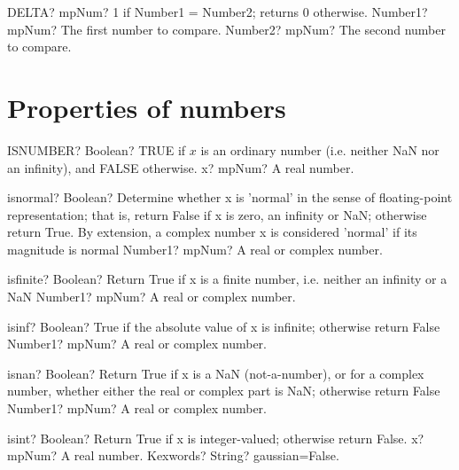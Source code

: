 \documentclass[12pt,a4paper,openany]{book}
\begin{document}
\begin{mpFunctionsExtract}
\mpWorksheetFunctionTwoNotImplemented
{DELTA? mpNum?  1 if Number1 = Number2; returns 0 otherwise.}
{Number1? mpNum? The first number to compare.}
{Number2? mpNum? The second number to compare.}
\end{mpFunctionsExtract}

\section{Properties of numbers}

\begin{mpFunctionsExtract}
\mpWorksheetFunctionOneNotImplemented
{ISNUMBER? Boolean? TRUE if $x$ is an ordinary number (i.e. neither NaN nor an infinity), and FALSE otherwise.}
{x? mpNum? A real number.}
\end{mpFunctionsExtract}

\begin{mpFunctionsExtract}
\mpFunctionOne
{isnormal? Boolean?  Determine whether x is 'normal' in the sense of floating-point representation; that is, return False if x is zero, an infinity or NaN; otherwise return True. By extension, a complex number x is considered 'normal' if its magnitude is normal}
{Number1? mpNum? A real or complex number.}
\end{mpFunctionsExtract}

\begin{mpFunctionsExtract}
\mpFunctionOne
{isfinite? Boolean?  Return True if x is a finite number, i.e. neither an infinity or a NaN}
{Number1? mpNum? A real or complex number.}
\end{mpFunctionsExtract}

\begin{mpFunctionsExtract}
\mpFunctionOne
{isinf? Boolean?  True if the absolute value of x is infinite; otherwise return False}
{Number1? mpNum? A real or complex number.}
\end{mpFunctionsExtract}

\begin{mpFunctionsExtract}
\mpFunctionOne
{isnan? Boolean?  Return True if x is a NaN (not-a-number), or for a complex number, whether either the real or complex part is NaN; otherwise return False}
{Number1? mpNum? A real or complex number.}
\end{mpFunctionsExtract}

\begin{mpFunctionsExtract}
\mpFunctionTwo
{isint? Boolean? Return True if x is integer-valued; otherwise return False.}
{x? mpNum? A real number.}
{Kexwords? String? gaussian=False.}
\end{mpFunctionsExtract}
\end{document}

